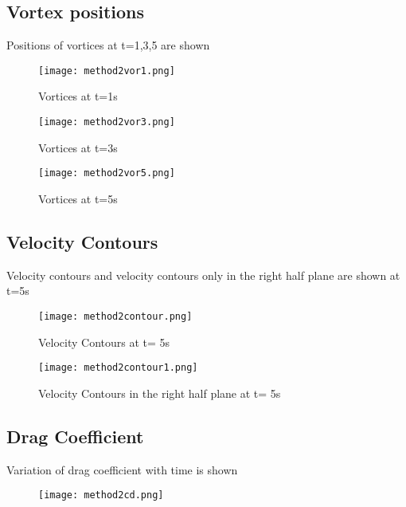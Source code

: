 \documentclass[11pt, a4paper]{article}
\begin{document}
\subsection{Vortex positions}
Positions of vortices at t=1,3,5 are shown 
\begin{figure}[H]
\centering
\texttt{[image: method2vor1.png]}
\caption{Vortices at t=1s}
\end{figure}
\begin{figure}[H]
\centering
\texttt{[image: method2vor3.png]}
\caption{Vortices at t=3s}
\end{figure}
\begin{figure}[H]
\centering
\texttt{[image: method2vor5.png]}
\caption{Vortices at t=5s}
\end{figure}
\subsection{Velocity Contours}
Velocity contours and velocity contours only in the right half plane are shown at t=5s
\begin{figure}[H]
\texttt{[image: method2contour.png]}
\caption{Velocity Contours at t= 5s}
\end{figure}
\begin{figure}[H]
\texttt{[image: method2contour1.png]}
\caption{Velocity Contours in the right half plane at t= 5s}
\end{figure}
\subsection{Drag Coefficient}
Variation of drag coefficient with time is shown
\begin{figure}[H]
\texttt{[image: method2cd.png]}
\end{figure}
\end{document}
